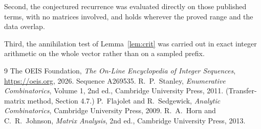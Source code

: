 \documentclass[11pt,a4paper]{article}
\theoremstyle{plain}
\theoremstyle{definition}
\begin{document}
Second, the conjectured recurrence was evaluated directly on those published terms, with no
matrices involved, and holds wherever the proved range and the data overlap.

Third, the annihilation test of Lemma~\ref{lem:crit} was carried out in exact integer
arithmetic on the whole vector rather than on a sampled prefix.

\begin{thebibliography}{9}
 The OEIS Foundation, \emph{The On-Line Encyclopedia of Integer
Sequences}, \url{https://oeis.org}, 2026. Sequence A269535.
 R.~P.~Stanley, \emph{Enumerative Combinatorics}, Volume 1, 2nd ed.,
Cambridge University Press, 2011. (Transfer-matrix method, Section 4.7.)
 P.~Flajolet and R.~Sedgewick, \emph{Analytic Combinatorics}, Cambridge
University Press, 2009.
 R.~A.~Horn and C.~R.~Johnson, \emph{Matrix Analysis}, 2nd ed., Cambridge
University Press, 2013.
\end{thebibliography}
\end{document}
